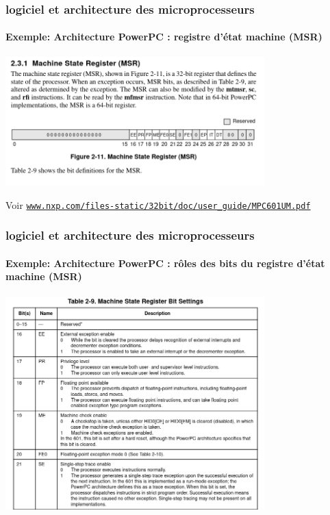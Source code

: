 \documentclass[xcolor=svgnames,final,smaller,a4]{beamer}
\begin{document}
\begin{frame}
  \frametitle{logiciel et architecture des microprocesseurs}
  \framesubtitle{Exemple: Architecture PowerPC : registre d'état machine (MSR)}
  \includegraphics[width=0.75\textwidth]{powerpc-machstatereg}


  \vspace{0.3cm}

  Voir \href{https://www.nxp.com/files-static/32bit/doc/user_guide/MPC601UM.pdf}{\texttt{www.nxp.com/files-static/32bit/doc/user\_guide/MPC601UM.pdf}}
\end{frame}

\begin{frame}
  \frametitle{logiciel et architecture des microprocesseurs}
  \framesubtitle{Exemple: Architecture PowerPC : rôles des bits du registre d'état machine (MSR)}
  \includegraphics[width=0.75\textwidth]{powerpc-msr-bits}


\end{frame}
\end{document}
